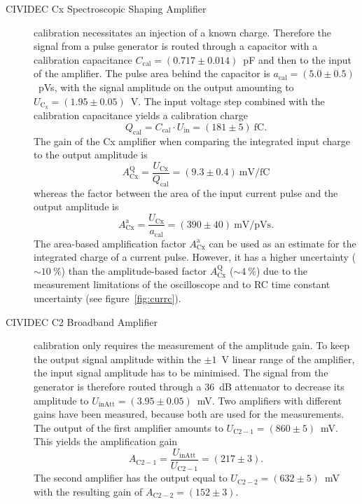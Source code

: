 \begin{description}
\item[CIVIDEC Cx Spectroscopic Shaping Amplifier] calibration necessitates an injection of a known charge. Therefore the signal from a pulse generator is routed through a capacitor with a calibration capacitance $C_{\mathrm{cal}}=(0.717\pm0.014)$~pF and then to the input of the amplifier. The pulse area behind the capacitor is $a_{\mathrm{cal}}=(5.0\pm0.5)$~pVs, with the signal amplitude on the output amounting to $U_{\mathrm{C_x}}=(1.95\pm0.05)$~V. The input voltage step combined with the calibration capacitance yields a calibration charge
\begin{equation}
Q_{\mathrm{cal}}=C_{\mathrm{cal}}\cdot U_{\mathrm{in}}=(181\pm5)~\mathrm{fC}.
\end{equation}
The gain of the Cx amplifier when comparing the integrated input charge to the output amplitude is 
\begin{equation}
A^{\mathrm{Q}}_{\mathrm{Cx}}=\frac{U_{\mathrm{Cx}}}{Q_{\mathrm{cal}} }=(9.3\pm0.4)~\mathrm{mV/fC}
\end{equation}
whereas the factor between the area of the input current pulse and the output amplitude is 
\begin{equation}
A^{\mathrm{a}}_{\mathrm{Cx}}=\frac{U_{\mathrm{Cx}}}{a_{\mathrm{cal}} }=(390\pm40)~\mathrm{mV/pVs}. 
\end{equation}
The area-based amplification factor $A^{\mathrm{a}}_{\mathrm{Cx}}$ can be used as an estimate for the integrated charge of a current pulse. However, it has a higher uncertainty ($\sim10~\%$) than the amplitude-based factor $A^{\mathrm{Q}}_{\mathrm{Cx}}$ ($\sim4~\%$) due to the measurement limitations of the oscilloscope and to RC time constant uncertainty (see figure~\ref{fig:currc}).

\item[CIVIDEC C2 Broadband Amplifier] calibration only requires the measurement of the amplitude gain. To keep the output signal amplitude within the $\pm1$~V linear range of the amplifier, the input signal amplitude has to be minimised. The signal from the generator is therefore routed through a 36~dB attenuator to decrease its amplitude to $U_{\mathrm{inAtt}}=(3.95\pm0.05)$~mV. Two amplifiers with different gains have been measured, because both are used for the measurements. The output of the first amplifier amounts to $U_{\mathrm{C2-1}}=(860\pm5)$~mV. This yields the amplification gain 
\begin{equation}
A_{\mathrm{C2-1}}=\frac{U_{\mathrm{inAtt}}}{U_{\mathrm{C2-1}}} =(217\pm3). 
\end{equation}
The second amplifier has the output equal to $U_{\mathrm{C2-2}}=(632\pm5)$~mV with the resulting gain of $A_{\mathrm{C2-2}}=(152\pm3)$. 
\end{description}


